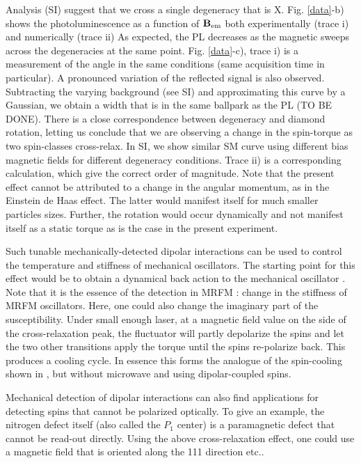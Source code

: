 \documentclass[preprintnumbers,amsmath,amssymb,superscriptaddress,twocolumn,showpacs]{revtex4-1}
\begin{document}
Analysis (SI) suggest that we cross a single degeneracy that is X.
 Fig. \ref{data}-b) shows the photoluminescence as a function of $\bf B_{\rm em}$ both experimentally (trace i) and numerically (trace ii)
As expected, the PL decreases as the magnetic sweeps across the degeneracies at the same point. 
 Fig. \ref{data}-c), trace i) is a measurement of the angle in the same conditions (same acquisition time in particular). 
A pronounced variation of the reflected signal is also observed. Subtracting the varying background (see SI) and approximating this curve by a Gaussian, we obtain a width that is in the same ballpark as the PL (TO BE DONE).
There is a close correspondence between degeneracy and diamond rotation, letting us conclude that we are observing a change in the spin-torque as two spin-classes cross-relax. 
In SI, we show similar SM curve using different bias magnetic fields for different degeneracy conditions. 
Trace ii) is a corresponding calculation, which give the correct order of magnitude.  
Note that the present effect cannot be attributed to a change in the angular momentum, as in the Einstein de Haas effect. 
The latter would manifest itself for much smaller particles sizes. Further, the rotation would occur dynamically and not manifest itself as a static torque as is the case in the present experiment. 

Such tunable mechanically-detected dipolar interactions can be used to control the temperature and stiffness of mechanical oscillators.
The starting point for this effect would be to obtain a dynamical back action to the mechanical oscillator \cite{aspelmeyer}. 
Note that it is the essence of the detection in MRFM : change in the stiffness of MRFM oscillators. Here, one could also change the imaginary part of the susceptibility.
Under small enough laser, at a magnetic field value on the side of the cross-relaxation peak, the fluctuator will partly depolarize the spins and let the two other transitions apply the torque until the spins re-polarize back. This produces a cooling cycle.  
In essence this forms the analogue of the spin-cooling shown in \cite{DelordNat}, but without microwave and using dipolar-coupled spins.

Mechanical detection of dipolar interactions can also find applications for detecting spins that cannot be polarized optically. 
To give an example, the nitrogen defect itself (also called the $P_1$ center) is a paramagnetic defect that cannot be read-out directly. 
Using the above cross-relaxation effect, one could use a magnetic field that is oriented along the 111 direction etc..
\end{document}
